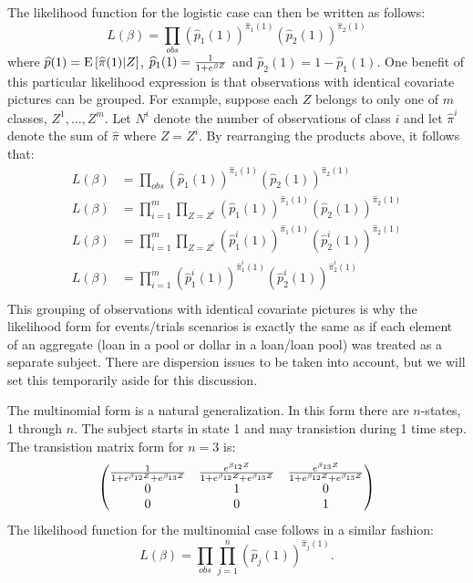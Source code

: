 \documentclass[10pt]{article}
\begin{document}
The likelihood function for the logistic case can then be written as follows:
$$L(\beta)=\prod_{obs} (\widehat{p}_1(1))^{\widehat{\pi}_1(1)}(\widehat{p}_2(1))^{\widehat{\pi}_2(1)}$$
where $\widehat{p}(1)=\text{E}\left[{\widehat{\pi}(1)|Z}\right]$, $\widehat{p}_1(1)={1\over 1+e^{\beta Z}}$ and $\widehat{p}_2(1)=1-\widehat{p}_1(1)$.
One benefit of this particular likelihood expression is that observations with identical covariate pictures can be grouped. For example, suppose 
each $Z$ belongs to only one of $m$ classes, $Z^1, \ldots, Z^m$. Let $N^i$ denote the number of observations of class $i$ and let 
$\widehat{\pi}^i$ denote the sum of $\widehat{\pi}$ where $Z=Z^i$. By rearranging the products above, it follows that:
\begin{align*}
L(\beta)&=\prod_{obs} (\widehat{p}_1(1))^{\widehat{\pi}_1(1)}(\widehat{p}_2(1))^{\widehat{\pi}_2(1)}\\
L(\beta)&=\prod_{i=1}^{m}\prod_{Z=Z^i}(\widehat{p}_1(1))^{\widehat{\pi}_1(1)}(\widehat{p}_2(1))^{\widehat{\pi}_2(1)}\\
L(\beta)&=\prod_{i=1}^{m}\prod_{Z=Z^i}(\widehat{p}^i_1(1))^{\widehat{\pi}_1(1)}(\widehat{p}^i_2(1))^{\widehat{\pi}_2(1)}\\
L(\beta)&=\prod_{i=1}^{m}(\widehat{p}^i_1(1))^{\widehat{\pi}^i_1(1)}(\widehat{p}^i_2(1))^{\widehat{\pi}^i_2(1)}\\
\end{align*}
This grouping of observations with identical covariate pictures is why the likelihood form for events/trials scenarios is exactly the same as
if each element of an aggregate (loan in a pool or dollar in a loan/loan pool) was treated as a separate subject. There are dispersion issues 
to be taken into account, but we will set this temporarily aside for this discussion.

The multinomial form is a natural generalization.  In this form there are $n$-states, 1 through $n$. The subject starts in state 1 and 
may transistion during 1 time step.  The transistion matrix form for $n=3$ is:
\begin{equation*}
\begin{pmatrix}
  {1                \over 1+e^{\beta_{12} Z}+e^{\beta_{13} Z}} 
& {e^{\beta_{12} Z} \over 1+e^{\beta_{12} Z}+e^{\beta_{13} Z}} 
& {e^{\beta_{13} Z} \over 1+e^{\beta_{12} Z}+e^{\beta_{13} Z}} \\
0 & 1 & 0 \\
0 & 0 & 1
\end{pmatrix}
\end{equation*}
The likelihood function for the multinomial case follows in a similar fashion:
$$L(\beta)=\prod_{obs} \prod_{j=1}^n(\widehat{p}_j(1))^{\widehat{\pi}_j(1)}.$$
\end{document}
